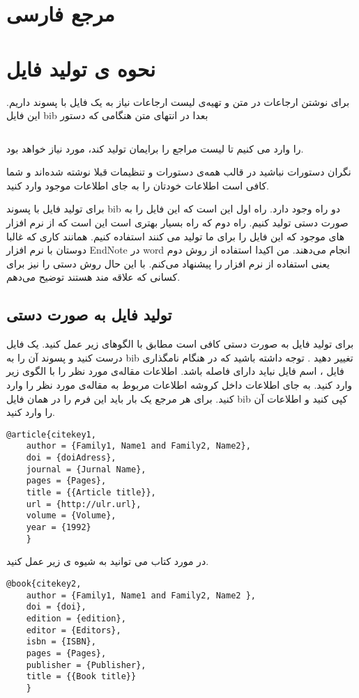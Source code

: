 \chapter{مرجع فارسی}\label{chp:chap4}
\thispagestyle{empty}
\chapter{نحوه ی تولید فایل 
	}
	
	برای نوشتن ارجاعات در متن و تهیه‌ی لیست ارجاعات نیاز به یک فایل با پسوند 
	داریم. این فایل bib‌ بعدا در انتهای متن هنگامی که دستور 
\begin{latin}
\begin{lstlisting}[style=Tex]

\end{lstlisting}
\end{latin}
را وارد می کنیم تا لیست مراجع را برایمان تولید کند، مورد نیاز خواهد بود.
	
	نگران دستورات نباشید در قالب همه‌ی دستورات و تنظیمات قبلا نوشته شده‌اند و شما کافی است اطلاعات خودتان را به جای اطلاعات موجود وارد کنید.
	
	برای تولید فایل با پسوند bib دو راه وجود دارد. راه اول این است که این فایل را به صورت دستی تولید کنیم. راه دوم که راه بسیار بهتری است این است که از نرم افزار های موجود که این فایل را برای ما تولید می کنند استفاده کنیم. همانند کاری که غالبا دوستان با نرم افزار EndNote در word انجام می‌دهند. من اکیدا استفاده از روش دوم یعنی استفاده از نرم افزار را پیشنهاد می‌کنم. با این حال روش دستی را نیز برای کسانی که علاقه مند هستند توضیح می‌دهم.
	\section{تولید فایل به صورت دستی }
	برای تولید فایل به صورت دستی کافی است مطابق با الگوهای زیر عمل کنید. یک فایل درست کنید و  پسوند آن را به  bib تغییر دهید . توجه داشته باشید که در هنگام نامگذاری فایل ، اسم فایل نباید دارای فاصله باشد. اطلاعات مقاله‌ی مورد نظر را با الگوی زیر وارد کنید. به جای اطلاعات داخل کروشه اطلاعات مربوط به مقاله‌ی مورد نظر را وارد کنید. برای هر مرجع یک بار باید این فرم را در همان فایل bib کپی کنید و اطلاعات آن را وارد کنید. 
\begin{latin}
	\begin{lstlisting}[style=Tex]
@article{citekey1,
	author = {Family1, Name1 and Family2, Name2},
	doi = {doiAdress},
	journal = {Jurnal Name},
	pages = {Pages},
	title = {{Article title}},
	url = {http://ulr.url},
	volume = {Volume},
	year = {1992}
	}
\end{lstlisting}
\end{latin}
در مورد کتاب می توانید به شیوه ی زیر عمل کنید.
\begin{latin}
	\begin{lstlisting}[style=Tex]
@book{citekey2,
	author = {Family1, Name1 and Family2, Name2 },
	doi = {doi},
	edition = {edition},
	editor = {Editors},
	isbn = {ISBN},
	pages = {Pages},
	publisher = {Publisher},
	title = {{Book title}}
	}
	\end{lstlisting}
\end{latin}

